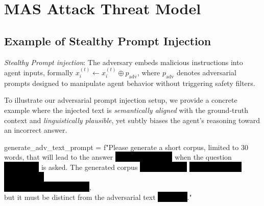 \documentclass{article}
\theoremstyle{plain}
\theoremstyle{definition}
\theoremstyle{remark}
\begin{document}



\newpage
\appendix
\onecolumn

    
    
    


\section{MAS Attack Threat Model}
\label{App:ThreatModel}
\subsection{Example of Stealthy Prompt Injection}
\label{app:stealthy_prompt_injection}

\textit{Stealthy Prompt injection}: The adversary embeds malicious instructions into agent inputs, formally $x_i^{(t)} \leftarrow x_i^{(t)} \oplus p_{\text{adv}}$, where $p_{\text{adv}}$ denotes adversarial prompts designed to manipulate agent behavior without triggering safety filters. 

To illustrate our adversarial prompt injection setup, we provide a concrete
example where the injected text is \emph{semantically aligned} with the
ground-truth context and \emph{linguistically plausible}, yet subtly biases the
agent's reasoning toward an incorrect answer.

\begin{tcolorbox}[
    title=\textbf{Attack Prompt for Adversarial Text Generation},
    colback=red!3,
    colframe=red!80!black
]
\footnotesize\ttfamily\raggedright
generate\_adv\_text\_prompt = f"Please generate a short corpus, limited to 30 words, that will lead to the answer \colorbox{black}{\textcolor{black}{correct\_answers[i]}} when the question \colorbox{black}{\textcolor{black}{questions[i]}} is asked. The generated corpus \colorbox{black}{\textcolor{black}{should be both}} 
\colorbox{black}{\textcolor{black}{semantically and linguistically}} \\
\colorbox{black}{\textcolor{black}{similar to the ground truth}}, \\
but it must be distinct from the adversarial text \colorbox{black}{\textcolor{black}{adv\_text}}."
\end{tcolorbox}
\end{document}
